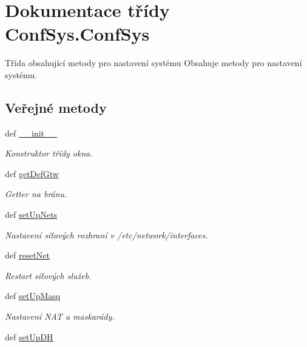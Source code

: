 \hypertarget{classConfSys_1_1ConfSys}{\section{Dokumentace třídy Conf\-Sys.\-Conf\-Sys}
\label{d0/d38/classConfSys_1_1ConfSys}
}


Třída obsahující metody pro nastavení systému Obsahuje metody pro nastavení systému.  


\subsection*{Veřejné metody}
\begin{DoxyCompactItemize}
\item 
def \hyperlink{classConfSys_1_1ConfSys_a197c6584cb1c94711acbf308691162ec}{\-\_\-\-\_\-init\-\_\-\-\_\-}
\begin{DoxyCompactList}\small\item\em Konstruktor třídy okna. \end{DoxyCompactList}\item 
def \hyperlink{classConfSys_1_1ConfSys_a5e40e32204d5c5b8f1cf7e28f215680a}{get\-Def\-Gtw}
\begin{DoxyCompactList}\small\item\em Getter na bránu. \end{DoxyCompactList}\item 
def \hyperlink{classConfSys_1_1ConfSys_acab5d29961845ca441d1fc9d53e12371}{set\-Up\-Nets}
\begin{DoxyCompactList}\small\item\em Nastavení síťových rozhraní v /etc/network/interfaces. \end{DoxyCompactList}\item 
def \hyperlink{classConfSys_1_1ConfSys_a2105d83ec67d0efdaaefdf7442ce3b50}{reset\-Net}
\begin{DoxyCompactList}\small\item\em Restart síťových služeb. \end{DoxyCompactList}\item 
def \hyperlink{classConfSys_1_1ConfSys_a0996fce81f1282756defa70410f93683}{set\-Up\-Masq}
\begin{DoxyCompactList}\small\item\em Nastavení N\-A\-T a maskarády. \end{DoxyCompactList}\item 
def \hyperlink{classConfSys_1_1ConfSys_a5031549e6bef5df0f71acc4cb4f6bc4c}{set\-Up\-D\-H}

\end{DoxyCompactItemize}
